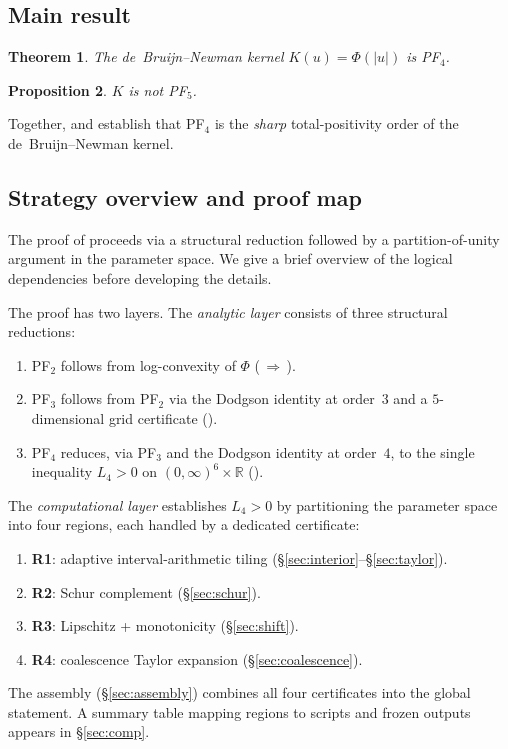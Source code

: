 \documentclass[11pt,a4paper]{amsart}
\newtheorem{theorem}{Theorem}[section]
\newtheorem{proposition}[theorem]{Proposition}
\theoremstyle{definition}
\theoremstyle{remark}
\newcommand{\R}{\mathbb{R}}
\begin{document}
\subsection{Main result}

\begin{theorem}\label{thm:main}
The de~Bruijn--Newman kernel $K(u) = \Phi(|u|)$ is PF$_4$.
\end{theorem}

\begin{proposition}\label{prop:not-pf5}
$K$ is not PF$_5$.
\end{proposition}

Together,  and  establish that
PF$_4$ is the \emph{sharp} total-positivity order of the
de~Bruijn--Newman kernel.

\subsection{Strategy overview and proof map}

The proof of  proceeds via a structural reduction
followed by a partition-of-unity argument in the parameter space.
We give a brief overview of the logical dependencies before
developing the details.

The proof has two layers.
The \emph{analytic layer} consists of three structural reductions:
\begin{enumerate}[label=(A\arabic*), nosep]
  \item PF$_2$ follows from log-convexity of $\Phi$
        ($\,\Rightarrow\,$).
  \item PF$_3$ follows from PF$_2$ via the Dodgson identity
        at order~$3$ and a $5$-dimensional grid certificate
        ().
  \item PF$_4$ reduces, via PF$_3$ and the Dodgson identity
        at order~$4$, to the single inequality $L_4 > 0$
        on $(0,\infty)^6 \times \R$ ().
\end{enumerate}
The \emph{computational layer} establishes $L_4 > 0$ by partitioning
the parameter space into four regions, each handled by a dedicated
certificate:
\begin{enumerate}[label=(C\arabic*), nosep]
  \item \textbf{R1}: adaptive interval-arithmetic tiling
        (\S\ref{sec:interior}--\S\ref{sec:taylor}).
  \item \textbf{R2}: Schur complement
        (\S\ref{sec:schur}).
  \item \textbf{R3}: Lipschitz + monotonicity
        (\S\ref{sec:shift}).
  \item \textbf{R4}: coalescence Taylor expansion
        (\S\ref{sec:coalescence}).
\end{enumerate}
The assembly (\S\ref{sec:assembly}) combines all four certificates
into the global statement.
A summary table mapping regions to scripts and frozen outputs
appears in \S\ref{sec:comp}.
\end{document}
